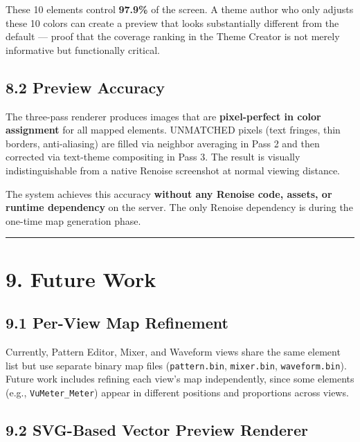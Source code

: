\documentclass[
  11pt,
  oneside]{report}
\begin{document}
These 10 elements control \textbf{97.9\%} of the screen. A theme author
who only adjusts these 10 colors can create a preview that looks
substantially different from the default --- proof that the coverage
ranking in the Theme Creator is not merely informative but functionally
critical.

\subsection{8.2 Preview Accuracy}\label{preview-accuracy}

The three-pass renderer produces images that are \textbf{pixel-perfect
in color assignment} for all mapped elements. UNMATCHED pixels (text
fringes, thin borders, anti-aliasing) are filled via neighbor averaging
in Pass 2 and then corrected via text-theme compositing in Pass 3. The
result is visually indistinguishable from a native Renoise screenshot at
normal viewing distance.

The system achieves this accuracy \textbf{without any Renoise code,
assets, or runtime dependency} on the server. The only Renoise
dependency is during the one-time map generation phase.

\begin{center}\rule{0.5\linewidth}{0.5pt}\end{center}

\section{9. Future Work}\label{future-work}

\subsection{9.1 Per-View Map Refinement}\label{per-view-map-refinement}

Currently, Pattern Editor, Mixer, and Waveform views share the same
element list but use separate binary map files (\texttt{pattern.bin},
\texttt{mixer.bin}, \texttt{waveform.bin}). Future work includes
refining each view's map independently, since some elements (e.g.,
\texttt{VuMeter\_Meter}) appear in different positions and proportions
across views.

\subsection{9.2 SVG-Based Vector Preview
Renderer}\label{svg-based-vector-preview-renderer}
\end{document}
